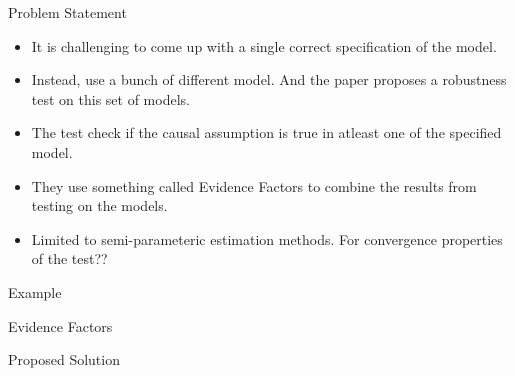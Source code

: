 \documentclass{beamer}
\begin{document}
\begin{frame}{Problem Statement}
	\begin{itemize}
		\item It is challenging to come up with a single correct specification of the model.
		\item Instead, use a bunch of different model. And the paper proposes a robustness test on this set of models.
		\item The test check if the causal assumption is true in atleast one of the specified model.
		\item They use something called Evidence Factors to combine the results from testing on the models.
		\item Limited to semi-parameteric estimation methods. For convergence properties of the test??
	\end{itemize}
\end{frame}

\begin{frame}{Example}
\end{frame}

\begin{frame}{Evidence Factors}

\end{frame}

\begin{frame}{Proposed Solution}
\end{frame}
\end{document}
